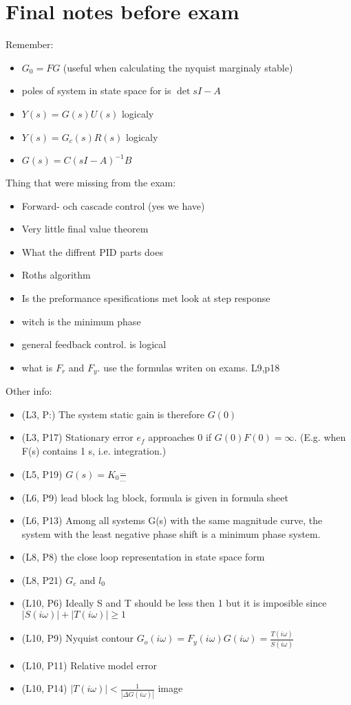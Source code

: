 \section{Final notes before exam}

Remember:
\begin{itemize}
    \item $G_0 = FG$ (useful when calculating the nyquist marginaly stable)
    \item poles of system in state space for is $\det{sI-A}$ 
    \item $Y(s) = G(s)U(s)$ logicaly
    \item $Y(s) = G_c(s)R(s)$ logicaly
    \item $G(s) = C(sI-A)^{-1}B$ 
\end{itemize}

Thing that were missing from the exam:
\begin{itemize}
    \item Forward- och cascade control (yes we have)
    \item Very little final value theorem
    \item What the diffrent PID parts does
    \item Roths algorithm
    \item Is the preformance spesifications met look at step response
    \item witch is the minimum phase
    \item general feedback control. is logical
    \item what is $F_r$ and $F_y$. use the formulas writen on exams. L9,p18
\end{itemize}

Other info:
\begin{itemize}
    \item (L3, P:) The system static gain is therefore $G(0)$ 
    \item (L3, P17) Stationary error $e_f$ approaches $0$ if $G(0)F(0) = \infty$. (E.g. when F(s) contains 1 s, i.e. integration.)
    \item (L5, P19) $G(s)=K_0\frac{\ldots}{\ldots}$
    \item (L6, P9) lead block lag block, formula is given in formula sheet
    \item (L6, P13) Among all systems G(s) with the same magnitude curve, the system with the least negative phase shift is a minimum phase system.
    \item (L8, P8) the close loop representation in state space form 
    \item (L8, P21) $G_c$ and $l_0$
    \item (L10, P6) Ideally S and T should be less then 1 but it is imposible since $|S(i\omega)|+|T(i\omega)|\geq 1$
    \item (L10, P9) Nyquist contour $G_o(i\omega) = F_y(i\omega)G(i\omega) = \frac{T(i\omega)}{S(i\omega)}$
    \item (L10, P11) Relative model error 
    \item (L10, P14) $|T(i\omega)| < \frac{1}{|\Delta G(i\omega)|}$ image
\end{itemize}
